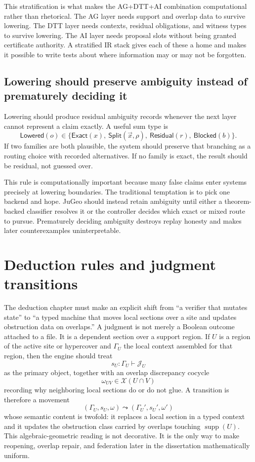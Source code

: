 \documentclass[11pt]{report}
\begin{document}
This stratification is what makes the AG+DTT+AI combination computational rather than rhetorical. The AG layer needs support and overlap data to survive lowering. The DTT layer needs contexts, residual obligations, and witness types to survive lowering. The AI layer needs proposal slots without being granted certificate authority. A stratified IR stack gives each of these a home and makes it possible to write tests about where information may or may not be forgotten.

\section{Lowering should preserve ambiguity instead of prematurely deciding it}
Lowering should produce residual ambiguity records whenever the next layer cannot represent a claim exactly. A useful sum type is
\[
\mathsf{Lowered}(o) \in \{\mathsf{Exact}(x),\ \mathsf{Split}(\vec{x},\rho),\ \mathsf{Residual}(r),\ \mathsf{Blocked}(b)\}.
\]
If two families are both plausible, the system should preserve that branching as a routing choice with recorded alternatives. If no family is exact, the result should be residual, not guessed over.

This rule is computationally important because many false claims enter systems precisely at lowering boundaries. The traditional temptation is to pick one backend and hope. JuGeo should instead retain ambiguity until either a theorem-backed classifier resolves it or the controller decides which exact or mixed route to pursue. Prematurely deciding ambiguity destroys replay honesty and makes later counterexamples uninterpretable.

\chapter{Deduction rules and judgment transitions}
The deduction chapter must make an explicit shift from ``a verifier that mutates state'' to ``a typed machine that moves local sections over a site and updates obstruction data on overlaps.'' A judgment is not merely a Boolean outcome attached to a file. It is a dependent section over a support region. If $U$ is a region of the active site or hypercover and $\Gamma_U$ the local context assembled for that region, then the engine should treat
\[
s_U : \Gamma_U \vdash \mathcal{J}_U
\]
as the primary object, together with an overlap discrepancy cocycle
\[
\omega_{UV} \in \mathcal{X}(U \cap V)
\]
recording why neighboring local sections do or do not glue. A transition is therefore a movement
\[
(\Gamma_U, s_U, \omega) \leadsto (\Gamma_U', s_U', \omega')
\]
whose semantic content is twofold: it replaces a local section in a typed context and it updates the obstruction class carried by overlaps touching $\operatorname{supp}(U)$. This algebraic-geometric reading is not decorative. It is the only way to make reopening, overlap repair, and federation later in the dissertation mathematically uniform.
\end{document}
